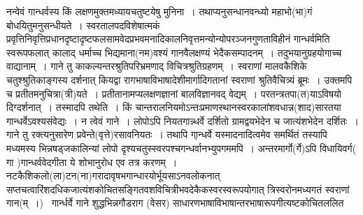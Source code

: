 \documentclass[11pt, openany]{book}
\begin{document}
नन्वेवं गान्धर्वस्य किं लक्षणमुक्त{\qtt मध्यायचतुष्टयेषु मुनिना}~। तथाप्यनुसन्धानवन्ध्यो महाभो(भा)गं बोधयितुमनुसन्धीयते~। स्वरतालपदविशेषात्मकं प्रवृत्तिनिवृत्तिप्रधानदृष्टादृष्टफलसामवेदप्रभवमनादिकालनिवृत्तमन्योन्योपरञ्जनगुणताविहीनं गान्धर्वमिति स्वरूपफलात् कालाद् धर्माच्च भिद्यमाना(नम)वश्यं गानवैलक्षण्यं भेदैकसम्पादनम्~। तदुभयानुग्रहयोगाच्च वाद्यानाम्~। गाने तु काकल्यन्तरश्रुतिपरिभ्रमणाद् विचित्रश्रुतिग्रहणम्~। स्वराणां मालवकैशिके चतुश्श्रुतिकाङ्गस्य दर्शनात् कियद्वा रागभाषाविभाषादेशीमार्गादिगतानां स्वराणां श्रुतिवैचित्र्यं ब्रूमः~। उक्तमपि च प्रतीतमनुचित्रा(त्री)यते~। प्रतीतानामप्यलक्षणज्ञानां बालविज्ञानवद् वेद्यम्~। परतन्त्रतपा(त)याऽविषयो दिग्दर्शनात्~। तस्मादपि तथेति~। किं चान्तरालनियमोऽन्तःप्रमाणस्थानस्वरकालांशवधान्न(शाद)सारतया गान्धर्वेऽवश्यसंवेद्यः~। न त्वेवं गाने~। लोपोऽपि नियतगान्न्धर्वे दर्शितो ग्रामद्वयभेदेन च जात्यंशभेदेन दर्शितः~। गाने तु रक्त्यनुसारेण प्रवेन्ते(वृत्ते)रसावनियतः~। तथापि गा्न्धर्वे यस्मादनादित्वमेव समर्थितं तस्यापि मध्यमस्य भिन्नषड्जकालिन्यां लोपो दृश्यचतुस्स्वरपश्चगन्धर्वानभ्युपगममपि~। अन्तरमार्गो(र्गे)ऽपि विधायिवर्ग( गा )गान्धर्ववेदगीता ये शोभानुरोध एव तत्र करणम्~। नटकैशिकलो(ला)टन(ना)गरादावृषभगान्धारयोर्भूयसाऽनवलोकनात् सप्तचत्वारिंशदधिकजात्यंशकोचितसङ्गितवशविचित्रीभवदेकैकस्वरस्वरूपयोगात् त्रिस्वरोनमध्यगतं स्वराणां गान(म्~।) \textendash\ गार्न्धर्वे गाने शुद्धभिन्नगौडराग (वेसर) साधारणभाषाविभाषान्तरभाषारूपगीत्यष्टकोचितललित \textendash

\newpage
{}
\end{document}
